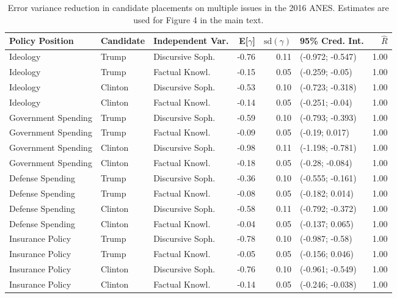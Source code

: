 \begin{table}[ht]
\centering
\caption{Error variance reduction in candidate placements on multiple issues in the 2016 ANES.
         Estimates are used for Figure 4 in the main text.} 
\label{app:hetreg2016}
\begin{tabular}{lllrrlr}
  \hline
Policy Position & Candidate & Independent Var. & E[$\gamma$] & $\text{sd}(\gamma)$ & 95\% Cred. Int. & $\hat{R}$ \\ 
  \hline
Ideology & Trump & Discursive Soph. & -0.76 & 0.11 & (-0.972; -0.547) & 1.00 \\ 
  Ideology & Trump & Factual Knowl. & -0.15 & 0.05 & (-0.259; -0.05) & 1.00 \\ 
  Ideology & Clinton & Discursive Soph. & -0.53 & 0.10 & (-0.723; -0.318) & 1.00 \\ 
  Ideology & Clinton & Factual Knowl. & -0.14 & 0.05 & (-0.251; -0.04) & 1.00 \\ 
  Government Spending & Trump & Discursive Soph. & -0.59 & 0.10 & (-0.793; -0.393) & 1.00 \\ 
  Government Spending & Trump & Factual Knowl. & -0.09 & 0.05 & (-0.19; 0.017) & 1.00 \\ 
  Government Spending & Clinton & Discursive Soph. & -0.98 & 0.11 & (-1.198; -0.781) & 1.00 \\ 
  Government Spending & Clinton & Factual Knowl. & -0.18 & 0.05 & (-0.28; -0.084) & 1.00 \\ 
  Defense Spending & Trump & Discursive Soph. & -0.36 & 0.10 & (-0.555; -0.161) & 1.00 \\ 
  Defense Spending & Trump & Factual Knowl. & -0.08 & 0.05 & (-0.182; 0.014) & 1.00 \\ 
  Defense Spending & Clinton & Discursive Soph. & -0.58 & 0.11 & (-0.792; -0.372) & 1.00 \\ 
  Defense Spending & Clinton & Factual Knowl. & -0.04 & 0.05 & (-0.137; 0.065) & 1.00 \\ 
  Insurance Policy & Trump & Discursive Soph. & -0.78 & 0.10 & (-0.987; -0.58) & 1.00 \\ 
  Insurance Policy & Trump & Factual Knowl. & -0.05 & 0.05 & (-0.156; 0.046) & 1.00 \\ 
  Insurance Policy & Clinton & Discursive Soph. & -0.76 & 0.10 & (-0.961; -0.549) & 1.00 \\ 
  Insurance Policy & Clinton & Factual Knowl. & -0.14 & 0.05 & (-0.246; -0.038) & 1.00 \\ 

\end{tabular}
\end{table}
